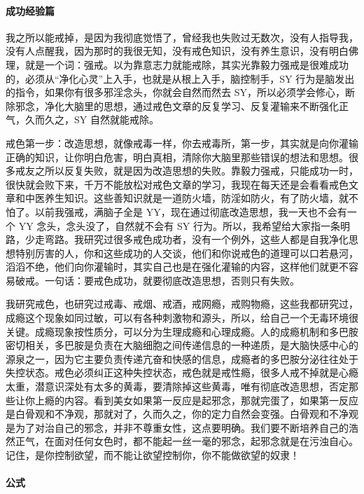 \documentclass{ctexart}
\begin{document}
\paragraph{成功经验篇}

我之所以能戒掉，是因为我彻底觉悟了，曾经我也失败过无数次，没有人指导我，没有人点醒我，因为那时的我很无知，没有戒色知识，没有养生意识，没有明白佛理，就是一个词：强戒。以为靠意志力就能戒除，其实光靠毅力强戒是很难成功的，必须从“净化心灵”上入手，也就是从根上入手，脑控制手，SY 行为是脑发出的指令，如果你有很多邪淫念头，你就会自然而然去 SY，所以必须学会修心，断除邪念，净化大脑里的思想，通过戒色文章的反复学习、反复灌输来不断强化正气，久而久之，SY 自然就能戒除。

戒色第一步：改造思想，就像戒毒一样，你去戒毒所，第一步，其实就是向你灌输正确的知识，让你明白危害，明白真相，清除你大脑里那些错误的想法和思想。很多戒友之所以反复失败，就是因为改造思想的失败。靠毅力强戒，只能成功一时，很快就会败下来，千万不能放松对戒色文章的学习，我现在每天还是会看看戒色文章和中医养生知识。这些善知识就是一道防火墙，防淫如防火，有了防火墙，就不怕了。以前我强戒，满脑子全是 YY，现在通过彻底改造思想，我一天也不会有一个 YY 念头，念头没了，自然就不会有 SY 行为。所以，我希望给大家指一条明路，少走弯路。我研究过很多戒色成功者，没有一个例外，这些人都是自我净化思想特别厉害的人，你和这些成功的人交谈，他们和你说戒色的道理可以口若悬河，滔滔不绝，他们向你灌输时，其实自己也是在强化灌输的内容，这样他们就更不容易破戒。一句话：要戒色成功，就要彻底改造思想，否则只有失败。

我研究戒色，也研究过戒毒、戒烟、戒酒，戒网瘾，戒购物瘾，这些我都研究过，成瘾这个现象如同过敏，可以有各种刺激物和源头，所以，给自己一个无毒环境很关键。成瘾现象按性质分，可以分为生理成瘾和心理成瘾。人的成瘾机制和多巴胺密切相关，多巴胺是负责在大脑细胞之间传递信息的一种递质，是大脑快感中心的源泉之一，因为它主要负责传递亢奋和快感的信息，成瘾者的多巴胺分泌往往处于失控状态。戒色必须纠正这种失控状态，戒色就是戒性瘾，很多人戒不掉就是心瘾太重，潜意识深处有太多的黄毒，要清除掉这些黄毒，唯有彻底改造思想，否定那些让你上瘾的内容。看到美女如果第一反应是起邪念，那就完蛋了，如果第一反应是白骨观和不净观，那就对了，久而久之，你的定力自然会变强。白骨观和不净观是为了对治自己的邪念，并非不尊重女性，这点要明确。我们要不断培养自己的浩然正气，在面对任何女色时，都不能起一丝一毫的邪念，起邪念就是在污浊自心。记住，是你控制欲望，而不能让欲望控制你，你不能做欲望的奴隶！

\paragraph{公式}
\end{document}
